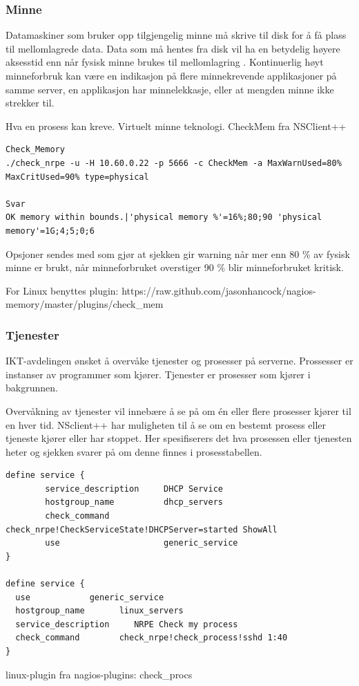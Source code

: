 \subsubsection{Minne}
Datamaskiner som bruker opp tilgjengelig minne må skrive til disk for å få plass til mellomlagrede data. Data som må hentes fra disk vil ha en betydelig høyere aksesstid enn når fysisk minne brukes til mellomlagring \cite{wiki:mem}. 
Kontinuerlig høyt minneforbruk kan være en indikasjon på flere minnekrevende applikasjoner på samme server, en applikasjon har minnelekkasje, eller at mengden minne ikke strekker til.

Hva en prosess kan kreve. Virtuelt minne teknologi. CheckMem fra NSClient++

\begin{lstlisting}
Check_Memory
./check_nrpe -u -H 10.60.0.22 -p 5666 -c CheckMem -a MaxWarnUsed=80% MaxCritUsed=90% type=physical

Svar
OK memory within bounds.|'physical memory %'=16%;80;90 'physical memory'=1G;4;5;0;6
\end{lstlisting}

Opsjoner sendes med som gjør at sjekken gir warning når mer enn 80 \% av fysisk minne er brukt, når minneforbruket overstiger 90 \% blir minneforbruket kritisk.

For Linux benyttes plugin: https://raw.github.com/jasonhancock/nagios-memory/master/plugins/check\_mem

\subsubsection{Tjenester}
IKT-avdelingen ønsket å overvåke tjenester og prosesser på serverne. Prossesser er instanser av programmer som kjører. Tjenester er prosesser som kjører i bakgrunnen. 

Overvåkning av tjenester vil innebære å se på om én eller flere prosesser kjører
til en hver tid. NSclient++ har muligheten til å se om en bestemt prosess eller tjeneste kjører eller har stoppet. Her spesifiserers det hva prosessen eller tjenesten heter og sjekken svarer på om denne finnes i prosesstabellen.
\begin{lstlisting}
define service {
        service_description     DHCP Service
        hostgroup_name          dhcp_servers
        check_command           check_nrpe!CheckServiceState!DHCPServer=started ShowAll
        use                     generic_service
}

define service {
  use            generic_service
  hostgroup_name       linux_servers
  service_description     NRPE Check my process
  check_command        check_nrpe!check_process!sshd 1:40
}
\end{lstlisting}
linux-plugin fra nagios-plugins: check\_procs 

